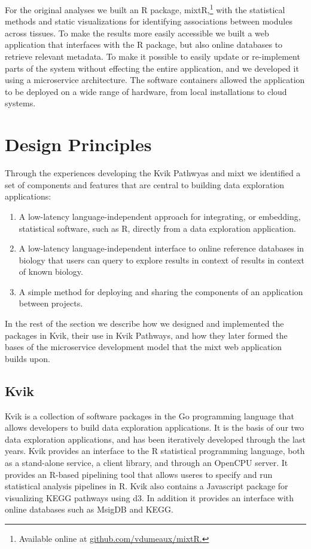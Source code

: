 For the original analyses we built an R package, mixtR,\footnote{Available
online at \url{github.com/vdumeaux/mixtR.}} with the statistical methods and
static visualizations for identifying associations between modules across
tissues. To make the results more easily accessible we built a web application
that interfaces with the R package, but also online databases to retrieve
relevant metadata. To make it possible to easily update or re-implement parts of
the system without effecting the entire application, and we developed it using a
microservice architecture. The software containers allowed the application to be
deployed on a wide range of hardware, from local installations to cloud systems.


\section{Design Principles}\label{challengeref} 
Through the experiences developing the Kvik Pathwyas and \gls{mixt} we
identified a set of components and features that are central to building data
exploration applications: 

\begin{enumerate}
    \item A low-latency language-independent approach for integrating, or
        embedding, statistical software, such as R, directly from a data
        exploration application. 
    \item A low-latency language-independent interface to online reference
        databases in biology that users can query to explore results in context
        of results in context of known biology. 
    \item A simple method for deploying and sharing the components of an
        application between projects. 
\end{enumerate} 


In the rest of the section we describe how we designed and implemented the
packages in Kvik, their use in Kvik Pathways, and how they later formed the
bases of the microservice development model that the \gls{mixt} web application
builds upon. 

\subsection{Kvik}
Kvik is a collection of software packages in the Go programming language that
allows developers to build data exploration applications. It is the basis of our
two data exploration applications, and has been iteratively developed through
the last years. Kvik provides an interface to the R statistical programming
language, both as a stand-alone service, a client library, and through an
OpenCPU server. It provides an R-based pipelining tool that allows useres to
specify and run statistical analysis pipelines in R.  Kvik also contains a
Javascript package for visualizing KEGG pathways using d3.  In addition it
provides an interface with online databases such as MsigDB and KEGG. 

